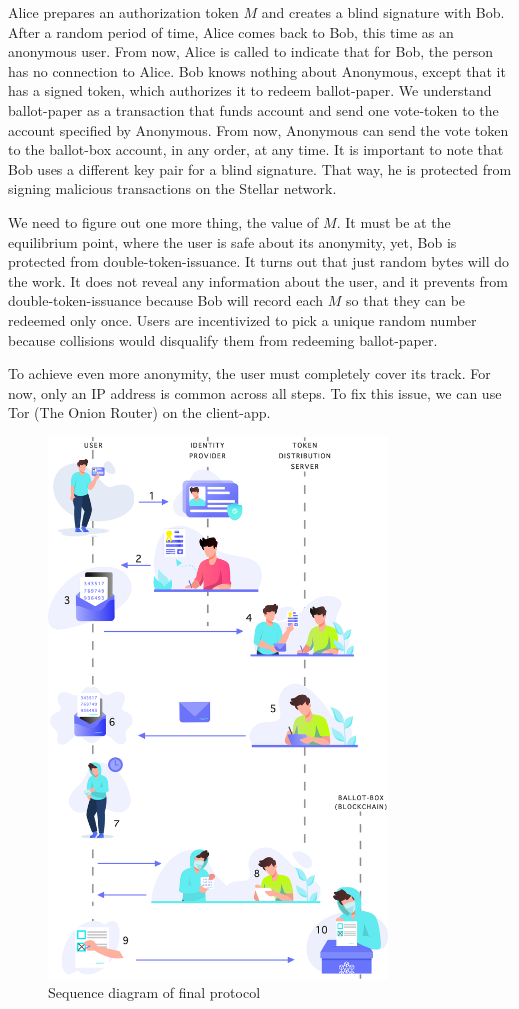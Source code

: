 \documentclass[applsci,article,submit,moreauthors,pdftex]{Definitions/mdpi}
\begin{document}
Alice prepares an authorization token $M$ and creates a blind signature with Bob. After a random period of time, Alice comes back to Bob, this time as an anonymous user. From now, Alice is called  to indicate that for Bob, the person has no connection to Alice. Bob knows nothing about Anonymous, except that it has a signed token, which authorizes it to redeem ballot-paper. We understand ballot-paper as a transaction that funds account and send one vote-token to the account specified by Anonymous. From now, Anonymous can send the vote token to the ballot-box account, in any order, at any time.
It is important to note that Bob uses a different key pair for a blind signature. That way, he is protected from signing malicious transactions on the Stellar network. 

We need to figure out one more thing, the value of $M$. It must be at the equilibrium point, where the user is safe about its anonymity, yet, Bob is protected from double-token-issuance. It turns out that just random bytes will do the work. It does not reveal any information about the user, and it prevents from double-token-issuance because Bob will record each $M$ so that they can be redeemed only once. Users are incentivized to pick a unique random number because collisions would disqualify them from redeeming ballot-paper.

To achieve even more anonymity, the user must completely cover its track. For now, only an IP address is common across all steps. To fix this issue, we can use Tor (The Onion Router) on the client-app. 

\begin{figure}[h]
\includegraphics[width=9cm]{figs/protocol-diagram.png}
\centering
\caption{Sequence diagram of final protocol}
\label{fig:sequence-diagram}
\end{figure} 
\end{document}

